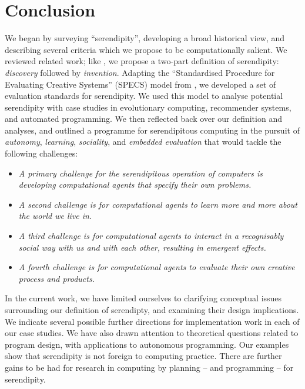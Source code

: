 \section{Conclusion} \label{sec:conclusion}

%
We began by surveying ``serendipity'', developing a broad historical
view, and describing several criteria  which we propose
to be computationally salient.  We reviewed related work; like
, we propose a two-part definition of
serendipity: \emph{discovery} followed by \emph{invention}.
%
Adapting the ``Standardised Procedure for Evaluating Creative
Systems'' (SPECS) model from , we developed a set
of evaluation standards for serendipity.
%
We used this model to analyse potential serendipity with case studies in evolutionary computing, recommender systems, and automated programming.
%
We then reflected back over our definition and analyses, and outlined a programme for
serendipitous computing in the pursuit of \emph{autonomy},
\emph{learning}, \emph{sociality}, and \emph{embedded evaluation} that
would tackle the following challenges:
%
\begin{itemize}
\item \emph{A primary challenge for the serendipitous operation of
  computers is developing computational agents that specify their own
  problems.}
\item \emph{A second challenge is for computational agents to learn
  more and more about the world we live in.}
\item \emph{A third challenge is for computational agents to interact
  in a recognisably social way with us and with each other, resulting
  in emergent effects.}
\item \emph{A fourth challenge is for computational agents to evaluate
  their own creative process and products.}
\end{itemize}
%
In the current work, we have limited ourselves to clarifying
conceptual issues surrounding our definition of serendipty, and
examining their design implications.
% 
We indicate several possible further directions for implementation
work in each of our case studies.  We have also drawn attention to
theoretical questions related to program design, with applications to
autonomous programming.  Our examples show that serendipity is not
foreign to computing practice.  There are further gains to be had for
research in computing by planning -- and programming -- for
serendipity.
%


